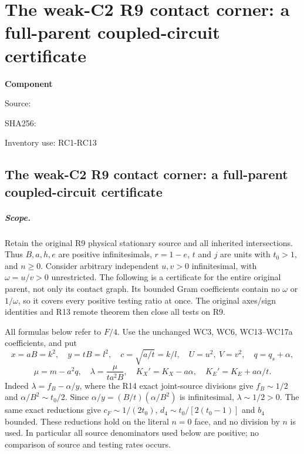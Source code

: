 \chapter{The weak-C2 R9 contact corner: a full-parent coupled-circuit certificate}
\label{component:pb18dc55f4f2f}
\noindent\textbf{Component }\par
{\small\noindent Source: \par}
{\small\noindent SHA256: \par}
{\small\noindent Inventory use: RC1-RC13\par}
\medskip
\section{The weak-C2 R9 contact corner: a full-parent coupled-circuit certificate}

\paragraph{Scope.}
Retain the original R9 physical stationary source and all inherited
intersections. Thus $B,a,h,e$ are positive infinitesimals,
$r=1-e$, $t$ and $j$ are units with $t_0>1$, and $n\ge0$.
Consider arbitrary independent $u,v>0$ infinitesimal, with
$\omega=u/v>0$ unrestricted. The following is a certificate for the
entire original parent, not only its contact graph. Its bounded Gram
coefficients contain no $\omega$ or $1/\omega$, so it covers every
positive testing ratio at once. The original axes/sign identities and
R13 remote theorem then close all tests on R9.

All formulas below refer to $F/4$. Use the unchanged WC3, WC6,
WC13--WC17a coefficients, and put
\[
 x=aB=k^2,\quad y=tB=l^2,\quad c=\sqrt{a/t}=k/l,
 \quad U=u^2,\ V=v^2,\quad q=q_s+\alpha,
\]
\[
 \mu=m-a^2q,\quad \lambda=\frac{\mu}{ta^2B},\quad
 K_X'=K_X-a\alpha,\quad K_E'=K_E+a\alpha/t.
\]
Indeed $\lambda=f_B-\alpha/y$, where the R14 exact joint-source
divisions give $f_B\sim1/2$ and $\alpha/B^2\sim t_0/2$. Since
$\alpha/y=(B/t)(\alpha/B^2)$ is infinitesimal, $\lambda\sim1/2>0$.
The same exact reductions give
$c_F\sim1/(2t_0)$, $d_4\sim t_0/[2(t_0-1)]$ and $b_4$ bounded.
These reductions hold on the literal $n=0$ face, and no division by
$n$ is used. In particular all source denominators used below are positive; no
comparison of source and testing rates occurs.

